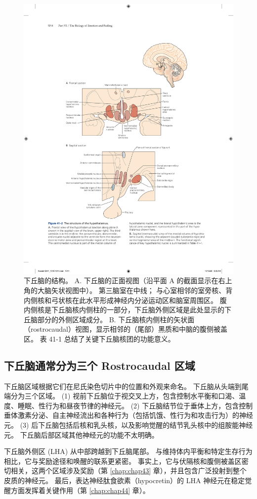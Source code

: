 \begin{figure}[htbp]
	\centering
	\includegraphics[width=0.75\linewidth]{chap41/fig_41_2}
	\caption{下丘脑的结构。 A. 下丘脑的正面视图（沿平面 A 的截面显示在右上角的大脑矢状视图中）。 第三脑室在中线； 与心室相邻的室旁核、背内侧核和弓状核在此水平形成神经内分泌运动区和脑室周围区。 腹内侧核是下丘脑核内侧柱的一部分，下丘脑外侧区域是此处显示的下丘脑部分的外侧区域成分。 B. 下丘脑核内侧柱的矢状面（rostrocaudal）视图，显示相邻的（尾部）黑质和中脑的腹侧被盖区。 表 41-1 总结了关键下丘脑核团的功能意义。}
	\label{fig:41_2}
\end{figure}

\subsection{下丘脑通常分为三个 Rostrocaudal 区域}
下丘脑区域根据它们在尼氏染色切片中的位置和外观来命名。 下丘脑从头端到尾端分为三个区域。 (1) 视前下丘脑位于视交叉上方，包含控制水平衡和口渴、温度、睡眠、性行为和昼夜节律的神经元。 (2) 下丘脑结节位于垂体上方，包含控制垂体激素分泌、自主神经流出和各种行为（包括饥饿、性行为和攻击行为）的神经元。 (3) 后下丘脑包括后核和乳头核，以及影响觉醒的结节乳头核中的组胺能神经元。 下丘脑后部区域其他神经元的功能不太明确。

下丘脑外侧区 (LHA) 从中部跨越到下丘脑尾部。 与维持体内平衡和特定生存行为相比，它与奖励途径和唤醒的联系更紧密。 事实上，它与伏隔核和腹侧被盖区密切相关，这两个区域涉及奖励（第 \ref{chap:chap43} 章），并且包含广泛投射到整个皮质的神经元。 最后，表达神经肽食欲素（hypocretin）的 LHA 神经元在稳定觉醒方面发挥着关键作用（第 \ref{chap:chap44} 章）。


